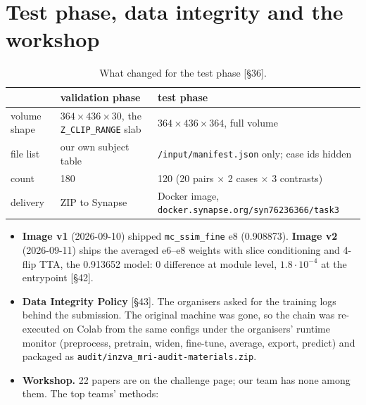 \documentclass[10pt,a4paper]{article}
\begin{document}
\section{Test phase, data integrity and the workshop}\label{sec:test}

\begin{table}[H]
\centering\small
\begin{tabular}{lll}
\toprule
& validation phase & test phase \\
\midrule
volume shape & $364\times436\times30$, the \texttt{Z\_CLIP\_RANGE} slab & $364\times436\times364$,
  full volume \\
file list & our own subject table & \texttt{/input/manifest.json} only; case ids hidden \\
count & 180 & 120 (20 pairs $\times$ 2 cases $\times$ 3 contrasts) \\
delivery & ZIP to Synapse & Docker image, \texttt{docker.synapse.org/syn76236366/task3} \\
\bottomrule
\end{tabular}
\caption{What changed for the test phase [\S36].}
\label{tab:phases}
\end{table}

\begin{itemize}
  \item \textbf{Image v1} (2026-09-10) shipped \texttt{mc\_ssim\_fine} e8 (0.908873). \textbf{Image
        v2} (2026-09-11) ships the averaged e6--e8 weights with slice conditioning and 4-flip TTA,
        the 0.913652 model: 0 difference at module level, $1.8\cdot10^{-4}$ at the entrypoint
        [\S42].
  \item \textbf{Data Integrity Policy} [\S43]. The organisers asked for the training logs behind
        the submission. The original machine was gone, so the chain was re-executed on Colab from
        the same configs under the organisers' runtime monitor (preprocess, pretrain, widen,
        fine-tune, average, export, predict) and packaged as
        \texttt{audit/inzva\_mri-audit-materials.zip}.
  \item \textbf{Workshop.} 22 papers are on the challenge page; our team has none among them. The
        top teams' methods:
\end{itemize}
\end{document}
